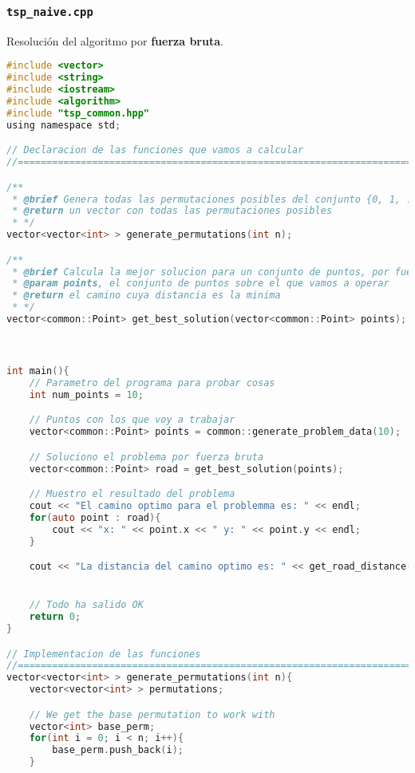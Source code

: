 \documentclass[10pt, a4paper]{article}
\theoremstyle{theorem-style}
\theoremstyle{theorem-style}
\theoremstyle{definition-style}
\theoremstyle{remark-style}
\theoremstyle{example-style}
\theoremstyle{definition-style}
\theoremstyle{remark-style}
\begin{document}
\subsubsection*{\texttt{tsp\_naive.cpp}}

Resolución del algoritmo por \textbf{fuerza bruta}.

\begin{lstlisting}[language=C]
#include <vector>
#include <string>
#include <iostream>
#include <algorithm>
#include "tsp_common.hpp"
using namespace std;

// Declaracion de las funciones que vamos a calcular
//==============================================================================

/**
 * @brief Genera todas las permutaciones posibles del conjunto {0, 1, ..., n-1}
 * @return un vector con todas las permutaciones posibles
 * */
vector<vector<int> > generate_permutations(int n);

/**
 * @brief Calcula la mejor solucion para un conjunto de puntos, por fuerza bruta
 * @param points, el conjunto de puntos sobre el que vamos a operar
 * @return el camino cuya distancia es la minima
 * */
vector<common::Point> get_best_solution(vector<common::Point> points);



int main(){
    // Parametro del programa para probar cosas
    int num_points = 10;

    // Puntos con los que voy a trabajar
    vector<common::Point> points = common::generate_problem_data(10);

    // Soluciono el problema por fuerza bruta
    vector<common::Point> road = get_best_solution(points);

    // Muestro el resultado del problema
    cout << "El camino optimo para el problemma es: " << endl;
    for(auto point : road){
        cout << "x: " << point.x << " y: " << point.y << endl;
    }

    cout << "La distancia del camino optimo es: " << get_road_distance(road) << endl;


    // Todo ha salido OK
    return 0;
}

// Implementacion de las funciones
//==============================================================================
vector<vector<int> > generate_permutations(int n){
    vector<vector<int> > permutations;

    // We get the base permutation to work with
    vector<int> base_perm;
    for(int i = 0; i < n; i++){
        base_perm.push_back(i);
    }


\end{lstlisting}
\end{document}
